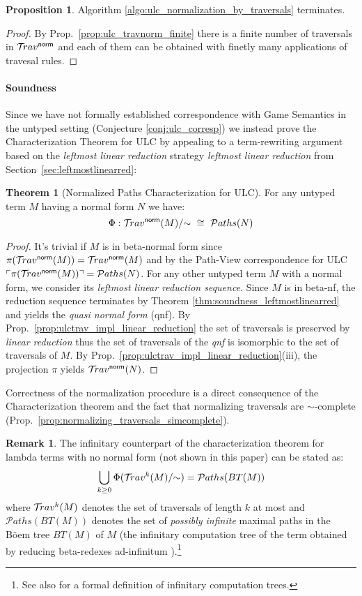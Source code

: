 \documentclass{article}
\theoremstyle{definition}
\newtheorem{proposition}{Proposition}[section]
\newtheorem{remark}{Remark}[section]
\newtheorem{theorem}{Theorem}[section]
\newcommand{\normalizing}{{\sf norm}}
\newcommand{\travsetnorm}{\travset^\normalizing}
\newcommand{\travulc}{\travset}
\def\coresymbol{\pi} %
\newcommand{\core}[1]{\coresymbol(#1)} %
\newcommand\pathset{{\mathcal{P}aths}} %
\begin{document}
\begin{proposition}
Algorithm \ref{algo:ulc_normalization_by_traversals} terminates.
\end{proposition}
\begin{proof}
By Prop.~\ref{prop:ulc_travnorm_finite} there is a finite number of traversals in $\travsetnorm$ and each of them can be obtained with finetly many applications of travesal rules.
\end{proof}

\paragraph{Soundness}
Since we have not formally established correspondence with Game Semantics in the untyped setting (Conjecture \ref{conj:ulc_corresp}) we instead prove the Characterization Theorem for ULC by appealing to a term-rewriting argument based on the \emph{leftmost linear reduction} strategy \emph{leftmost linear reduction} from Section~\ref{sec:leftmostlinearred}:

\begin{theorem}[Normalized Paths Characterization for ULC]
\label{thm:path_charact_ulc}
For any untyped term $M$ having a normal form $N$ we have:
$$\Phi : \travsetnorm(M)/{\sim} \ \cong\ \pathset(N)$$
\end{theorem}
\begin{proof}
It's trivial if $M$ is in beta-normal form since $\core{\travsetnorm(M)} = \travsetnorm(M)$ and by the Path-View correspondence for ULC $\pview{\core{\travsetnorm(M)}} = \pathset(N)$.
For any other untyped term $M$ with a normal form, we consider its \emph{leftmost linear reduction sequence}.
Since $M$ is in beta-nf, the reduction sequence terminates by Theorem \ref{thm:soundness_leftmostlinearred} and yields the \emph{quasi normal form} (qnf). By Prop.~\ref{prop:ulctrav_impl_linear_reduction} the set of traversals is preserved by \emph{linear reduction} thus the set of traversals of the \emph{qnf} is isomorphic to the set of traversals of $M$. By Prop.~\ref{prop:ulctrav_impl_linear_reduction}(iii), the projection $\coresymbol$ yields $\travsetnorm(N)$.
\end{proof}

Correctness of the normalization procedure is a direct consequence of the Characterization theorem and the fact that normalizing traversals are $\sim$-complete (Prop.~\ref{prop:normalizing_traversals_simcomplete}).

\begin{remark}
The infinitary counterpart of the characterization theorem for lambda terms with no normal form (not shown in this paper) can be stated as:
$$ \Union_{k\geq0} \Phi(\travulc^k(M)/{\sim}) = \pathset(BT(M))$$
where $\travulc^k(M)$ denotes the set of traversals of length $k$ at most and $\pathset(BT(M))$ denotes the set of \emph{possibly infinite} maximal paths in the B\"oem tree $BT(M)$ of $M$ (the infinitary computation tree of the term obtained by reducing beta-redexes ad-infinitum \cite{barendregt2013lambda}).\footnote{See also \cite{Blum17-HomogNotRestriction, Ong2006} for a formal definition of infinitary computation trees.}
\end{remark}
\end{document}
